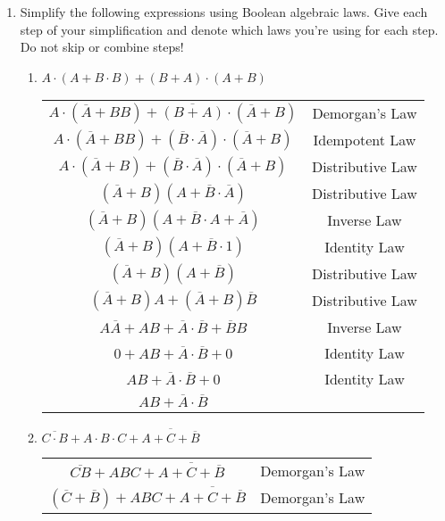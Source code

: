 \documentclass{article}
\begin{document}
    \begin{enumerate}
        \item Simplify the following expressions using Boolean algebraic laws. Give each step of your simplification and denote which laws you’re using for each step. Do not skip or combine steps!
        \begin{enumerate}
            \item $A \cdot (A + B \cdot B) + (B + A) \cdot (A + B)$\\[0.25in]
            \begin{tabular}{c | c}
                $A \cdot (\overline{A} + BB) + \overline{(B+A)} \cdot (\overline{A} + B)$ & Demorgan's Law\\
                $A \cdot (\overline{A} + BB) + (\overline{B} \cdot \overline{A}) \cdot (\overline{A} + B)$ & Idempotent Law\\
                $A \cdot (\overline{A} + B) + (\overline{B} \cdot \overline{A}) \cdot (\overline{A} + B)$ & Distributive Law\\
                $(\overline{A} + B)(A+\overline{B} \cdot \overline{A})$ & Distributive Law\\
                $(\overline{A} + B)(A + \overline{B} \cdot A + \overline{A})$ & Inverse Law\\
                $(\overline{A} + B)(A + \overline{B} \cdot 1)$ & Identity Law\\
                $(\overline{A} + B)(A + \overline{B})$ & Distributive Law\\
                $(\overline{A} + B)A + (\overline{A} + B)\overline{B}$ & Distributive Law\\
                $A\overline{A} + AB + \overline{A}\cdot\overline{B} + \overline{B}B$ & Inverse Law\\
                $0 + AB + \overline{A}\cdot\overline{B} + 0$ & Identity Law\\
                $AB + \overline{A}\cdot\overline{B} + 0$ & Identity Law\\
                $AB + \overline{A}\cdot\overline{B}$
            \end{tabular}
            \item $\overline{C \cdot B} + A \cdot B \cdot C + \overline{A + C + \overline{B}}$\\[0.25in]
            \begin{tabular}{c | c}
                $\overline{CB} + ABC + \overline{A + C + \overline{B}}$ & Demorgan's Law\\
                $(\overline{C} + \overline{B}) + ABC + \overline{A + C + \overline{B}}$ & Demorgan's Law\\

\end{tabular}
\end{enumerate}
\end{enumerate}
\end{document}
